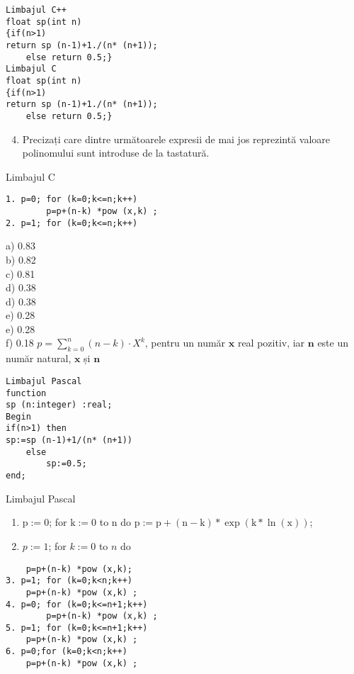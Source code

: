 \begin{verbatim}
Limbajul C++
float sp(int n)
{if(n>1)
return sp (n-1)+1./(n* (n+1));
    else return 0.5;}
Limbajul C
float sp(int n)
{if(n>1)
return sp (n-1)+1./(n* (n+1));
    else return 0.5;}
\end{verbatim}

\begin{enumerate}
  \setcounter{enumi}{3}
  \item Precizați care dintre următoarele expresii de mai jos reprezintă valoare polinomului sunt introduse de la tastatură.
\end{enumerate}

Limbajul C

\begin{verbatim}
1. p=0; for (k=0;k<=n;k++)
        p=p+(n-k) *pow (x,k) ;
2. p=1; for (k=0;k<=n;k++)
\end{verbatim}

a) 0.83\\
b) 0.82\\
c) 0.81\\
d) 0.38\\
d) 0.38\\
e) 0.28\\
e) 0.28\\
f) 0.18 $p=\sum_{k=0}^{n}(n-k) \cdot X^{k}$, pentru un număr $\mathbf{x}$ real pozitiv, iar $\mathbf{n}$ este un număr natural, $\mathbf{x}$ și $\mathbf{n}$

\begin{verbatim}
Limbajul Pascal
function
sp (n:integer) :real;
Begin
if(n>1) then
sp:=sp (n-1)+1/(n* (n+1))
    else
        sp:=0.5;
end;
\end{verbatim}

Limbajul Pascal

\begin{enumerate}
  \item $\mathrm{p}:=0$; for $\mathrm{k}:=0$ to n do $\mathrm{p}:=\mathrm{p}+(\mathrm{n}-\mathrm{k}) * \exp (\mathrm{k} * \ln (\mathrm{x}))$;
  \item $p:=1$; for $k:=0$ to $n$ do
\end{enumerate}

\begin{verbatim}
    p=p+(n-k) *pow (x,k);
3. p=1; for (k=0;k<n;k++)
    p=p+(n-k) *pow (x,k) ;
4. p=0; for (k=0;k<=n+1;k++)
        p=p+(n-k) *pow (x,k) ;
5. p=1; for (k=0;k<=n+1;k++)
    p=p+(n-k) *pow (x,k) ;
6. p=0;for (k=0;k<n;k++)
    p=p+(n-k) *pow (x,k) ;
\end{verbatim}

